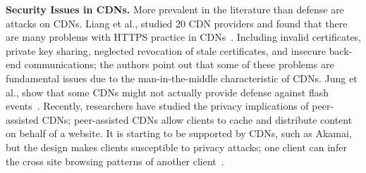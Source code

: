 \textbf{Security Issues in CDNs.} More prevalent in the literature than defense are attacks on CDNs.  Liang et al., studied 
20 CDN providers and found that there are many problems with HTTPS practice in CDNs~\cite{liang2014https}.  Including invalid certificates, private key sharing, neglected revocation of stale certificates, and insecure back-end communications; the authors point out that some of these problems are fundamental issues due to 
the man-in-the-middle characteristic of CDNs.  %
Jung et al., show 
that some CDNs might not actually provide defense against flash events~\cite{jung2002flash}.  Recently, researchers have studied the privacy implications of peer-assisted CDNs; peer-assisted CDNs allow clients to cache and distribute 
content on behalf of a website.  It is starting to be supported by CDNs, such as Akamai, but the design makes clients susceptible to privacy attacks; one client can infer the cross site browsing patterns of another client~\cite{jia2016anonymity}.



